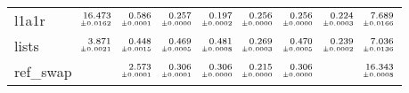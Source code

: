 \documentclass[a4paper,UKenglish]{lipics-v2016}
\begin{document}
\begin{table*}
\begin{adjustbox}{width=1.2\textwidth,center}
\begin{tabular}{lrrrrrrrr}
\addlinespace
l1a1r&$\substack{\mathmakebox[.7cm][r]{16.473}\\{\mathmakebox[.7cm][r]{\scriptscriptstyle \pm 0.0162}}}$&$\substack{\mathmakebox[.7cm][r]{0.586}\\{\mathmakebox[.7cm][r]{\scriptscriptstyle \pm 0.0001}}}$&$\substack{\mathmakebox[.7cm][r]{0.257}\\{\mathmakebox[.7cm][r]{\scriptscriptstyle \pm 0.0000}}}$&$\substack{\mathmakebox[.7cm][r]{0.197}\\{\mathmakebox[.7cm][r]{\scriptscriptstyle \pm 0.0002}}}$&$\substack{\mathmakebox[.7cm][r]{0.256}\\{\mathmakebox[.7cm][r]{\scriptscriptstyle \pm 0.0000}}}$&$\substack{\mathmakebox[.7cm][r]{0.256}\\{\mathmakebox[.7cm][r]{\scriptscriptstyle \pm 0.0000}}}$&$\substack{\mathmakebox[.7cm][r]{0.224}\\{\mathmakebox[.7cm][r]{\scriptscriptstyle \pm 0.0003}}}$&$\substack{\mathmakebox[.7cm][r]{7.689}\\{\mathmakebox[.7cm][r]{\scriptscriptstyle \pm 0.0166}}}$\\
\addlinespace
lists&$\substack{\mathmakebox[.7cm][r]{3.871}\\{\mathmakebox[.7cm][r]{\scriptscriptstyle \pm 0.0021}}}$&$\substack{\mathmakebox[.7cm][r]{0.448}\\{\mathmakebox[.7cm][r]{\scriptscriptstyle \pm 0.0015}}}$&$\substack{\mathmakebox[.7cm][r]{0.469}\\{\mathmakebox[.7cm][r]{\scriptscriptstyle \pm 0.0005}}}$&$\substack{\mathmakebox[.7cm][r]{0.481}\\{\mathmakebox[.7cm][r]{\scriptscriptstyle \pm 0.0008}}}$&$\substack{\mathmakebox[.7cm][r]{0.269}\\{\mathmakebox[.7cm][r]{\scriptscriptstyle \pm 0.0003}}}$&$\substack{\mathmakebox[.7cm][r]{0.470}\\{\mathmakebox[.7cm][r]{\scriptscriptstyle \pm 0.0005}}}$&$\substack{\mathmakebox[.7cm][r]{0.239}\\{\mathmakebox[.7cm][r]{\scriptscriptstyle \pm 0.0002}}}$&$\substack{\mathmakebox[.7cm][r]{7.036}\\{\mathmakebox[.7cm][r]{\scriptscriptstyle \pm 0.0136}}}$\\
\addlinespace
ref\_swap&&$\substack{\mathmakebox[.7cm][r]{2.573}\\{\mathmakebox[.7cm][r]{\scriptscriptstyle \pm 0.0001}}}$&$\substack{\mathmakebox[.7cm][r]{0.306}\\{\mathmakebox[.7cm][r]{\scriptscriptstyle \pm 0.0001}}}$&$\substack{\mathmakebox[.7cm][r]{0.306}\\{\mathmakebox[.7cm][r]{\scriptscriptstyle \pm 0.0000}}}$&$\substack{\mathmakebox[.7cm][r]{0.215}\\{\mathmakebox[.7cm][r]{\scriptscriptstyle \pm 0.0000}}}$&$\substack{\mathmakebox[.7cm][r]{0.306}\\{\mathmakebox[.7cm][r]{\scriptscriptstyle \pm 0.0000}}}$&&$\substack{\mathmakebox[.7cm][r]{16.343}\\{\mathmakebox[.7cm][r]{\scriptscriptstyle \pm 0.0008}}}$\\

\end{tabular}
\end{adjustbox}
\end{table*}
\end{document}
